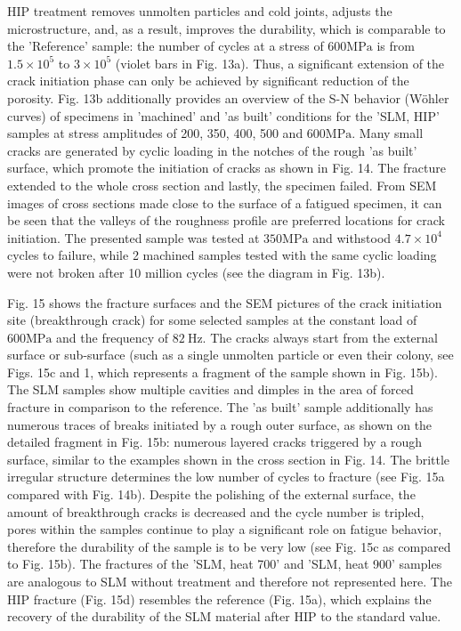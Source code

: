 \documentclass[10pt]{article}
\begin{document}
HIP treatment removes unmolten particles and cold joints, adjusts the microstructure, and, as a result, improves the durability, which is comparable to the 'Reference' sample: the number of cycles at a stress of $600 \mathrm{MPa}$ is from $1.5 \times 10^{5}$ to $3 \times 10^{5}$ (violet bars in Fig. 13a). Thus, a significant extension of the crack initiation phase can only be achieved by significant reduction of the porosity. Fig. 13b additionally provides an overview of the S-N behavior (Wöhler curves) of specimens in 'machined' and 'as built' conditions for the 'SLM, HIP' samples at stress amplitudes of 200, 350, 400, 500 and $600 \mathrm{MPa}$. Many small cracks are generated by cyclic loading in the notches of the rough 'as built' surface, which promote the initiation of cracks as shown in Fig. 14. The fracture extended to the whole cross section and lastly, the specimen failed. From SEM images of cross sections made close to the surface of a fatigued specimen, it can be seen that the valleys of the roughness profile are preferred locations for crack initiation. The presented sample was tested at $350 \mathrm{MPa}$ and withstood $4.7 \times 10^{4}$ cycles to failure, while 2 machined samples tested with the same cyclic loading were not broken after 10 million cycles (see the diagram in Fig. 13b).

Fig. 15 shows the fracture surfaces and the SEM pictures of the crack initiation site (breakthrough crack) for some selected samples at the constant load of $600 \mathrm{MPa}$ and the frequency of $82 \mathrm{~Hz}$. The cracks always start from the external surface or sub-surface (such as a single unmolten particle or even their colony, see Figs. 15c and 1, which represents a fragment of the sample shown in Fig. 15b). The SLM samples show multiple cavities and dimples in the area of forced fracture in comparison to the reference. The 'as built' sample additionally has numerous traces of breaks initiated by a rough outer surface, as shown on the detailed fragment in Fig. 15b: numerous layered cracks triggered by a rough surface, similar to the examples shown in the cross section in Fig. 14. The brittle irregular structure determines the low number of cycles to fracture (see Fig. 15a compared with Fig. 14b). Despite the polishing of the external surface, the amount of breakthrough cracks is decreased and the cycle number is tripled, pores within the samples continue to play a significant role on fatigue behavior, therefore the durability of the sample is to be very low (see Fig. 15c as compared to Fig. 15b). The fractures of the 'SLM, heat 700' and 'SLM, heat 900' samples are analogous to SLM without treatment and therefore not represented here. The HIP fracture (Fig. 15d) resembles the reference (Fig. 15a), which explains the recovery of the durability of the SLM material after HIP to the standard value.
\end{document}
